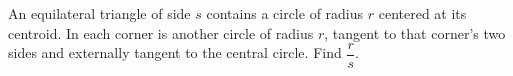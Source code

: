 An equilateral triangle of side $s$ contains a circle of radius $r$ centered at its centroid. In each corner is another circle of radius $r$, tangent to that corner's two sides and externally tangent to the central circle. Find $\dfrac{r}{s}$.

